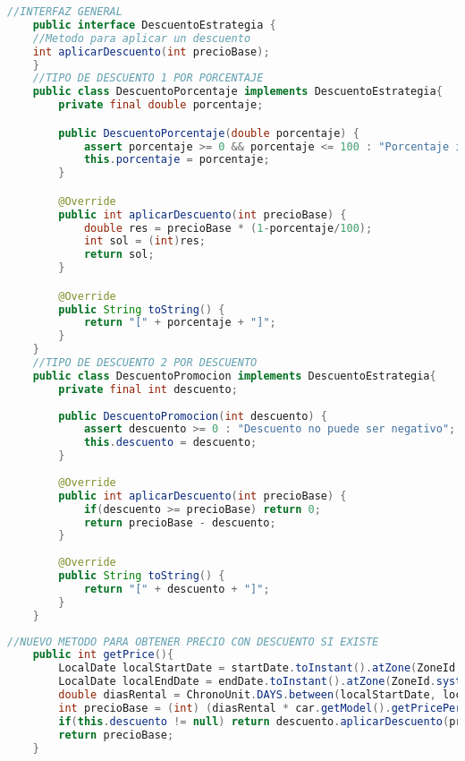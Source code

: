 \begin{lstlisting}[style = javaNormal, language=Java,caption={Clases generadas para el patron Strategy}] 
    //INTERFAZ GENERAL
    public interface DescuentoEstrategia {
    //Metodo para aplicar un descuento
    int aplicarDescuento(int precioBase);
    }
    //TIPO DE DESCUENTO 1 POR PORCENTAJE
    public class DescuentoPorcentaje implements DescuentoEstrategia{
        private final double porcentaje;

        public DescuentoPorcentaje(double porcentaje) {
            assert porcentaje >= 0 && porcentaje <= 100 : "Porcentaje invalido";
            this.porcentaje = porcentaje;
        }

        @Override
        public int aplicarDescuento(int precioBase) {
            double res = precioBase * (1-porcentaje/100);
            int sol = (int)res;
            return sol;
        }

        @Override
        public String toString() {
            return "[" + porcentaje + "]";
        }
    }
    //TIPO DE DESCUENTO 2 POR DESCUENTO 
    public class DescuentoPromocion implements DescuentoEstrategia{
        private final int descuento;
    
        public DescuentoPromocion(int descuento) {
            assert descuento >= 0 : "Descuento no puede ser negativo";
            this.descuento = descuento;
        }
    
        @Override
        public int aplicarDescuento(int precioBase) {
            if(descuento >= precioBase) return 0;
            return precioBase - descuento;
        }
    
        @Override
        public String toString() {
            return "[" + descuento + "]";
        }      
    }
\end{lstlisting}

\begin{lstlisting}[style = javaNormal, language=Java, caption={Metodo getPrice en la clase Rental}] 
    //NUEVO METODO PARA OBTENER PRECIO CON DESCUENTO SI EXISTE
    public int getPrice(){
        LocalDate localStartDate = startDate.toInstant().atZone(ZoneId.systemDefault()).toLocalDate();
        LocalDate localEndDate = endDate.toInstant().atZone(ZoneId.systemDefault()).toLocalDate();
        double diasRental = ChronoUnit.DAYS.between(localStartDate, localEndDate);
        int precioBase = (int) (diasRental * car.getModel().getPricePerDay());
        if(this.descuento != null) return descuento.aplicarDescuento(precioBase);
        return precioBase;
    }
\end{lstlisting}
